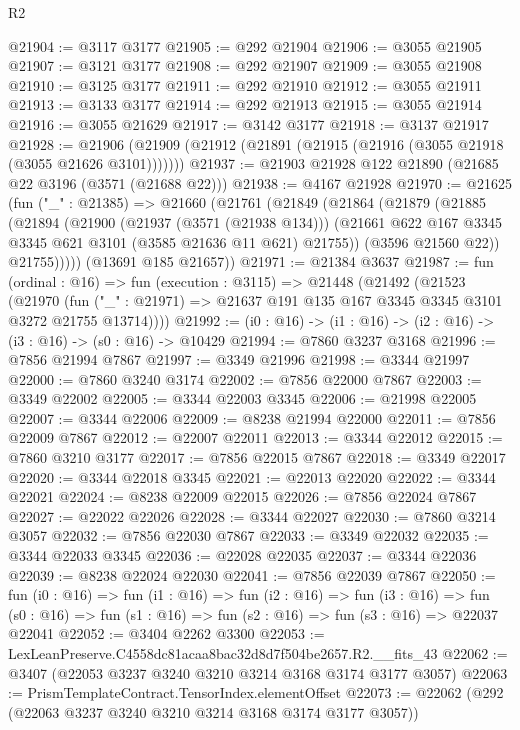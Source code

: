 \begin{lexlean}{R2}
\begin{coremodule}
@21904 := @3117 @3177
@21905 := @292 @21904
@21906 := @3055 @21905
@21907 := @3121 @3177
@21908 := @292 @21907
@21909 := @3055 @21908
@21910 := @3125 @3177
@21911 := @292 @21910
@21912 := @3055 @21911
@21913 := @3133 @3177
@21914 := @292 @21913
@21915 := @3055 @21914
@21916 := @3055 @21629
@21917 := @3142 @3177
@21918 := @3137 @21917
@21928 := @21906 (@21909 (@21912 (@21891 (@21915 (@21916 (@3055 @21918 (@3055 @21626 @3101)))))))
@21937 := @21903 @21928 @122 @21890 (@21685 @22 @3196 (@3571 (@21688 @22)))
@21938 := @4167 @21928
@21970 := @21625
    (fun ("_" : @21385) =>
    @21660
      (@21761
        (@21849
          (@21864
            (@21879
              (@21885
                (@21894
                  (@21900
                    (@21937 (@3571 (@21938 @134)))
                    (@21661 @622 @167 @3345 @3345 @621 @3101 (@3585 @21636 @11 @621) @21755))
                  (@3596 @21560 @22))
                @21755)))))
      (@13691 @185 @21657))
@21971 := @21384 @3637
@21987 := fun (ordinal : @16) =>
  fun (execution : @3115) =>
  @21448
    (@21492
      (@21523
        (@21970
          (fun ("_" : @21971) => @21637 @191 @135 @167 @3345 @3345 @3101 @3272 @21755 @13714))))
@21992 := (i0 : @16) -> (i1 : @16) -> (i2 : @16) -> (i3 : @16) -> (s0 : @16) -> @10429
@21994 := @7860 @3237 @3168
@21996 := @7856 @21994 @7867
@21997 := @3349 @21996
@21998 := @3344 @21997
@22000 := @7860 @3240 @3174
@22002 := @7856 @22000 @7867
@22003 := @3349 @22002
@22005 := @3344 @22003 @3345
@22006 := @21998 @22005
@22007 := @3344 @22006
@22009 := @8238 @21994 @22000
@22011 := @7856 @22009 @7867
@22012 := @22007 @22011
@22013 := @3344 @22012
@22015 := @7860 @3210 @3177
@22017 := @7856 @22015 @7867
@22018 := @3349 @22017
@22020 := @3344 @22018 @3345
@22021 := @22013 @22020
@22022 := @3344 @22021
@22024 := @8238 @22009 @22015
@22026 := @7856 @22024 @7867
@22027 := @22022 @22026
@22028 := @3344 @22027
@22030 := @7860 @3214 @3057
@22032 := @7856 @22030 @7867
@22033 := @3349 @22032
@22035 := @3344 @22033 @3345
@22036 := @22028 @22035
@22037 := @3344 @22036
@22039 := @8238 @22024 @22030
@22041 := @7856 @22039 @7867
@22050 := fun (i0 : @16) =>
  fun (i1 : @16) =>
  fun (i2 : @16) =>
  fun (i3 : @16) =>
  fun (s0 : @16) => fun (s1 : @16) => fun (s2 : @16) => fun (s3 : @16) => @22037 @22041
@22052 := @3404 @2262 @3300
@22053 := LexLeanPreserve.C4558dc81acaa8bac32d8d7f504be2657.R2.__fits_43
@22062 := @3407 (@22053 @3237 @3240 @3210 @3214 @3168 @3174 @3177 @3057)
@22063 := PrismTemplateContract.TensorIndex.elementOffset
@22073 := @22062 (@292 (@22063 @3237 @3240 @3210 @3214 @3168 @3174 @3177 @3057))

\end{coremodule}
\end{lexlean}
